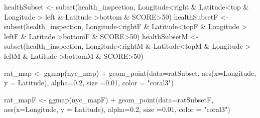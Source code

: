 \documentclass[
]{article}
\newenvironment{Shaded}{\begin{snugshade}}{\end{snugshade}}
\newcommand{\AttributeTok}[1]{\textcolor[rgb]{0.77,0.63,0.00}{#1}}
\newcommand{\DecValTok}[1]{\textcolor[rgb]{0.00,0.00,0.81}{#1}}
\newcommand{\FloatTok}[1]{\textcolor[rgb]{0.00,0.00,0.81}{#1}}
\newcommand{\FunctionTok}[1]{\textcolor[rgb]{0.00,0.00,0.00}{#1}}
\newcommand{\NormalTok}[1]{#1}
\newcommand{\OtherTok}[1]{\textcolor[rgb]{0.56,0.35,0.01}{#1}}
\newcommand{\SpecialCharTok}[1]{\textcolor[rgb]{0.00,0.00,0.00}{#1}}
\newcommand{\StringTok}[1]{\textcolor[rgb]{0.31,0.60,0.02}{#1}}
\begin{document}
\begin{Shaded}
\begin{Highlighting}[]
\NormalTok{healthSubset }\OtherTok{\textless{}{-}} \FunctionTok{subset}\NormalTok{(health\_inspection, Longitude}\SpecialCharTok{\textless{}}\NormalTok{right }\SpecialCharTok{\&}\NormalTok{ Latitude}\SpecialCharTok{\textless{}}\NormalTok{top }\SpecialCharTok{\&}\NormalTok{ Longitude }\SpecialCharTok{\textgreater{}}\NormalTok{ left }\SpecialCharTok{\&}\NormalTok{ Latitude }\SpecialCharTok{\textgreater{}}\NormalTok{bottom }\SpecialCharTok{\&}\NormalTok{ SCORE}\SpecialCharTok{\textgreater{}}\DecValTok{50}\NormalTok{)}
\NormalTok{healthSubsetF }\OtherTok{\textless{}{-}} \FunctionTok{subset}\NormalTok{(health\_inspection, Longitude}\SpecialCharTok{\textless{}}\NormalTok{rightF }\SpecialCharTok{\&}\NormalTok{ Latitude}\SpecialCharTok{\textless{}}\NormalTok{topF }\SpecialCharTok{\&}\NormalTok{ Longitude }\SpecialCharTok{\textgreater{}}\NormalTok{ leftF }\SpecialCharTok{\&}\NormalTok{ Latitude }\SpecialCharTok{\textgreater{}}\NormalTok{bottomF }\SpecialCharTok{\&}\NormalTok{ SCORE}\SpecialCharTok{\textgreater{}}\DecValTok{50}\NormalTok{)}
\NormalTok{healthSubsetM }\OtherTok{\textless{}{-}} \FunctionTok{subset}\NormalTok{(health\_inspection, Longitude}\SpecialCharTok{\textless{}}\NormalTok{rightM }\SpecialCharTok{\&}\NormalTok{ Latitude}\SpecialCharTok{\textless{}}\NormalTok{topM }\SpecialCharTok{\&}\NormalTok{ Longitude }\SpecialCharTok{\textgreater{}}\NormalTok{ leftM }\SpecialCharTok{\&}\NormalTok{ Latitude }\SpecialCharTok{\textgreater{}}\NormalTok{bottomM }\SpecialCharTok{\&}\NormalTok{ SCORE}\SpecialCharTok{\textgreater{}}\DecValTok{50}\NormalTok{)}

\NormalTok{rat\_map }\OtherTok{\textless{}{-}} \FunctionTok{ggmap}\NormalTok{(nyc\_map) }\SpecialCharTok{+}
  \FunctionTok{geom\_point}\NormalTok{(}\AttributeTok{data=}\NormalTok{ratSubset, }\FunctionTok{aes}\NormalTok{(}\AttributeTok{x=}\NormalTok{Longitude, }\AttributeTok{y =}\NormalTok{ Latitude), }\AttributeTok{alpha=}\FloatTok{0.2}\NormalTok{, }\AttributeTok{size =}\FloatTok{0.01}\NormalTok{, }\AttributeTok{color =} \StringTok{"coral3"}\NormalTok{)}

\NormalTok{rat\_mapF }\OtherTok{\textless{}{-}} \FunctionTok{ggmap}\NormalTok{(nyc\_mapF) }\SpecialCharTok{+}
  \FunctionTok{geom\_point}\NormalTok{(}\AttributeTok{data=}\NormalTok{ratSubsetF, }\FunctionTok{aes}\NormalTok{(}\AttributeTok{x=}\NormalTok{Longitude, }\AttributeTok{y =}\NormalTok{ Latitude), }\AttributeTok{alpha=}\FloatTok{0.2}\NormalTok{, }\AttributeTok{size =}\FloatTok{0.01}\NormalTok{, }\AttributeTok{color =} \StringTok{"coral3"}\NormalTok{)}


\end{Highlighting}
\end{Shaded}
\end{document}
